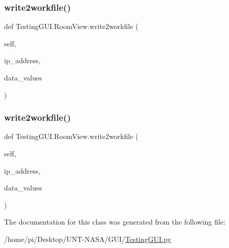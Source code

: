 \mbox{\label{classTestingGUI_1_1RoomView_a2c0434bb69cf431a9631990c9d445411}} 
\subsubsection{\texorpdfstring{write2workfile()}{write2workfile()}\hspace{0.1cm}{\footnotesize\ttfamily [1/2]}}
{\footnotesize\ttfamily def Testing\+G\+U\+I.\+Room\+View.\+write2workfile (\begin{DoxyParamCaption}\item[{}]{self,  }\item[{}]{ip\+\_\+address,  }\item[{}]{data\+\_\+values }\end{DoxyParamCaption})}

\mbox{\label{classTestingGUI_1_1RoomView_a2c0434bb69cf431a9631990c9d445411}} 
\subsubsection{\texorpdfstring{write2workfile()}{write2workfile()}\hspace{0.1cm}{\footnotesize\ttfamily [2/2]}}
{\footnotesize\ttfamily def Testing\+G\+U\+I.\+Room\+View.\+write2workfile (\begin{DoxyParamCaption}\item[{}]{self,  }\item[{}]{ip\+\_\+address,  }\item[{}]{data\+\_\+values }\end{DoxyParamCaption})}



The documentation for this class was generated from the following file\+:\begin{DoxyCompactItemize}
\item 
/home/pi/\+Desktop/\+U\+N\+T-\/\+N\+A\+S\+A/\+G\+U\+I/\hyperlink{GUI_2TestingGUI_8py}{Testing\+G\+U\+I.\+py}\end{DoxyCompactItemize}
